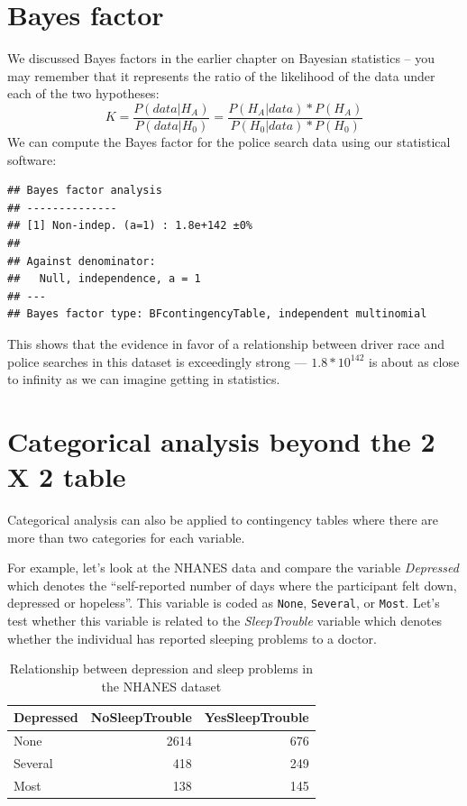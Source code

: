 \documentclass[
  12pt,
]{book}
\begin{document}
\hypertarget{bayes-factor}{%
\section{Bayes factor}\label{bayes-factor}}

We discussed Bayes factors in the earlier chapter on Bayesian statistics -- you may remember that it represents the ratio of the likelihood of the data under each of the two hypotheses:
\[ 
K = \frac{P(data|H_A)}{P(data|H_0)} = \frac{P(H_A|data)*P(H_A)}{P(H_0|data)*P(H_0)}
\]
We can compute the Bayes factor for the police search data using our statistical software:

\begin{verbatim}
## Bayes factor analysis
## --------------
## [1] Non-indep. (a=1) : 1.8e+142 ±0%
## 
## Against denominator:
##   Null, independence, a = 1 
## ---
## Bayes factor type: BFcontingencyTable, independent multinomial
\end{verbatim}

This shows that the evidence in favor of a relationship between driver race and police searches in this dataset is exceedingly strong --- \(1.8 * 10^{142}\) is about as close to infinity as we can imagine getting in statistics.

\hypertarget{categorical-analysis-beyond-the-2-x-2-table}{%
\section{Categorical analysis beyond the 2 X 2 table}\label{categorical-analysis-beyond-the-2-x-2-table}}

Categorical analysis can also be applied to contingency tables where there are more than two categories for each variable.

For example, let's look at the NHANES data and compare the variable \emph{Depressed} which denotes the ``self-reported number of days where the participant felt down, depressed or hopeless''. This variable is coded as \texttt{None}, \texttt{Several}, or \texttt{Most}. Let's test whether this variable is related to the \emph{SleepTrouble} variable which denotes whether the individual has reported sleeping problems to a doctor.

\begin{table}

\caption{\label{tab:unnamed-chunk-67}Relationship between depression and sleep problems in the NHANES dataset}
\centering
\begin{tabular}[t]{l|r|r}
\hline
Depressed & NoSleepTrouble & YesSleepTrouble\\
\hline
None & 2614 & 676\\
\hline
Several & 418 & 249\\
\hline
Most & 138 & 145\\
\hline
\end{tabular}
\end{table}
\end{document}
